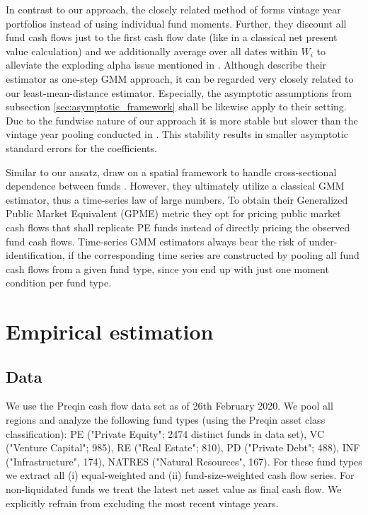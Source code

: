 \documentclass[12pt]{article}
\begin{document}
In contrast to our approach, the closely related method of \cite{DLP12} forms vintage year portfolios instead of using individual fund moments.
Further, they discount all fund cash flows just to the first cash flow date (like in a classical net present value calculation) and we additionally average over all dates within $W_{i}$ to alleviate the exploding alpha issue mentioned in \cite{DLP12}.
Although \cite{DLP12} describe their estimator as one-step GMM approach, it can be regarded very closely related to our least-mean-distance estimator.
Especially, the asymptotic assumptions from subsection \ref{sec:asymptotic_framework} shall be likewise apply to their setting.
Due to the fundwise nature of our approach it is more stable but slower than the vintage year pooling conducted in \cite{DLP12}.
This stability results in smaller asymptotic standard errors for the coefficients.

Similar to our ansatz, \cite{KN16} draw on a spatial framework to handle cross-sectional dependence between funds \citep{C99}.
However, they ultimately utilize a classical GMM estimator, thus a time-series law of large numbers.
To obtain their Generalized Public Market Equivalent (GPME) metric they opt for pricing public market cash flows that shall replicate PE funds instead of directly pricing the observed fund cash flows.
Time-series GMM estimators always bear the risk of under-identification, if the corresponding time series are constructed by pooling all fund cash flows from a given fund type, since you end up with just one moment condition per fund type.


\section{Empirical estimation}
\label{sec:empirical_estimation}

\subsection{Data}

We use the Preqin cash flow data set as of 26th February 2020.
We pool all regions and analyze the following fund types (using the Preqin asset class classification):
PE ("Private Equity"; 2474 distinct funds in data set),
VC ("Venture Capital"; 985),
RE ("Real Estate"; 810),
PD ("Private Debt"; 488),
INF ("Infrastructure", 174), 
NATRES ("Natural Resources", 167).
For these fund types we extract all (i) equal-weighted and (ii) fund-size-weighted cash flow series.
For non-liquidated funds we treat the latest net asset value as final cash flow.
We explicitly refrain from excluding the most recent vintage years.
\end{document}
